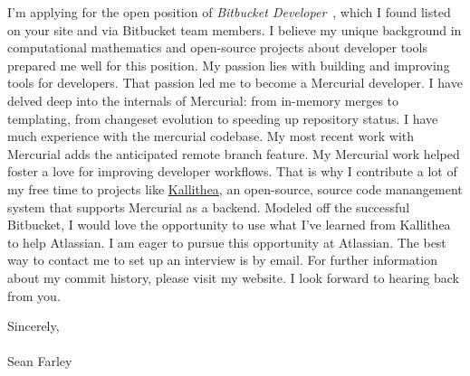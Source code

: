 \documentclass[]{fancy-cv}
\newcommand\company{Atlassian}
\newcommand\position{\emph{Bitbucket Developer}}
\begin{document}
I'm applying for the open position of \position~, which I found listed on your
site and via Bitbucket team members. I believe my unique background in
computational mathematics and open-source projects about developer tools
prepared me well for this position.
%
\newline\newline
%
My passion lies with building and improving tools for developers. That passion
led me to become a Mercurial developer. I have delved deep into the internals
of Mercurial: from in-memory merges to templating, from changeset evolution to
speeding up repository status. I have much experience with the mercurial
codebase. My most recent work with Mercurial adds the anticipated remote
branch feature.
%
\newline\newline
%
My Mercurial work helped foster a love for improving developer workflows. That
is why I contribute a lot of my free time to projects like
\href{https://kallithea-scm.org}{Kallithea}, an open-source, source code
manangement system that supports Mercurial as a backend. Modeled off the
successful Bitbucket, I would love the opportunity to use what I've learned
from Kallithea to help \company.
%
\newline\newline
%
I am eager to pursue this opportunity at \company. The best way to contact me
to set up an interview is by email. For further information about my commit
history, please visit my website. I look forward to hearing back from you.

\vspace{2em}
Sincerely,\\
\\
Sean Farley
\end{document}
